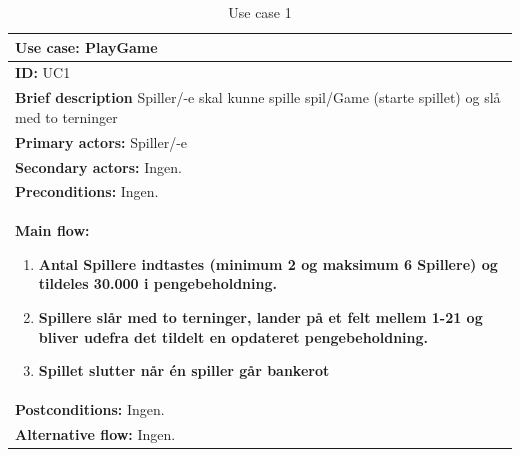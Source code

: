 \begin{table}[H]
    \begin{center}
        \begin{tabular}{ | p{15cm} |}
            \hline
            \textbf{Use case:} PlayGame \\ \hline
            \textbf{ID:} UC1 \\ \hline
            \textbf{Brief description} Spiller/-e skal kunne spille spil/Game (starte spillet) og slå med to terninger     \\ \hline
            \textbf{Primary actors:} Spiller/-e \\ \hline
            \textbf{Secondary actors:} Ingen. \\ \hline
            \textbf{Preconditions:} Ingen.     \\ \hline
            \textbf{Main flow:}
            \begin{enumerate}
                \item \textbf{Antal Spillere indtastes (minimum 2 og maksimum 6 Spillere) og tildeles 30.000 i pengebeholdning.}
                \item \textbf{Spillere slår med to terninger, lander på et felt mellem 1-21 og bliver udefra det tildelt en opdateret pengebeholdning.}
                \item \textbf{Spillet slutter når én spiller går bankerot}
            \end{enumerate} \\ \hline
            \textbf{Postconditions:} Ingen.\\ \hline
            \textbf{Alternative flow:} Ingen.\\ \hline
            \hline
        \end{tabular}
        \caption{Use case 1}
        \label{usecase:1}
    \end{center}
\end{table}

